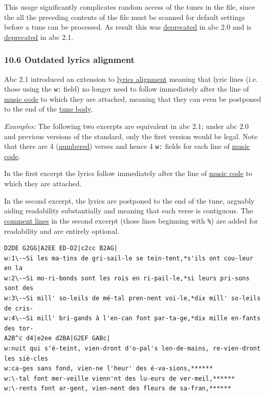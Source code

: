 \documentclass[oneside]{book}
\begin{document}
This usage significantly complicates random access of the tunes in the
file, since the all the preceding contents of the file must be scanned
for default settings before a tune can be processed. As result this was
\protect\hyperlink{outdated_syntax}{deprecated} in abc 2.0 and is
\protect\hyperlink{outdated_syntax}{deprecated} in abc 2.1.

\hypertarget{outdated_lyrics_alignment}{\subsubsection{10.6 Outdated
lyrics alignment}\label{outdated_lyrics_alignment}}

Abc 2.1 introduced an extension to \protect\hyperlink{alignment}{lyrics
alignment} meaning that lyric lines (i.e. those using the \texttt{w:}
field) no longer need to follow immediately after the line of
\protect\hyperlink{music_code_definition}{music code} to which they are
attached, meaning that they can even be postponed to the end of the
\protect\hyperlink{tune_body_definition}{tune body}.

\emph{Examples:} The following two excerpts are equivalent in abc 2.1;
under abc 2.0 and previous versions of the standard, only the first
version would be legal. Note that there are 4
(\protect\hyperlink{numbering}{numbered}) verses and hence 4 \texttt{w:}
fields for each line of \protect\hyperlink{music_code_definition}{music
code}.

In the first excerpt the lyrics follow immediately after the line of
\protect\hyperlink{music_code_definition}{music code} to which they are
attached.

In the second excerpt, the lyrics are postponed to the end of the tune,
arguably aiding readability substantially and meaning that each verse is
contiguous. The \protect\hyperlink{comment_definition}{comment lines} in
the second excerpt (those lines beginning with \texttt{\%}) are added
for readability and are entirely optional.

\begin{verbatim}
D2DE G2GG|A2EE ED-D2|c2cc B2AG|
w:1\-~Si les ma-tins de gri-sail-le se tein-tent,*s'ils ont cou-leur en la
w:2\-~Si mo-ri-bonds sont les rois en ri-pail-le,*si leurs pri-sons sont des
w:3\-~Si mill' so-leils de mé-tal pren-nent voi-le,*dix mill' so-leils de cris-
w:4\-~Si mill' bri-gands à l'en-can font par-ta-ge,*dix mille en-fants des tor-
A2B^c d4|e2ee d2BA|G2EF GABc|
w:nuit qui s'é-teint, vien-dront d'o-pal's len-de-mains, re-vien-dront les siè-cles
w:ca-ges sans fond, vien-ne l'heur' des é-va-sions,******
w:\-tal font mer-veille vienn'nt des lu-eurs de ver-meil,******
w:\-rents font ar-gent, vien-nent des fleurs de sa-fran,******
\end{verbatim}
\end{document}
